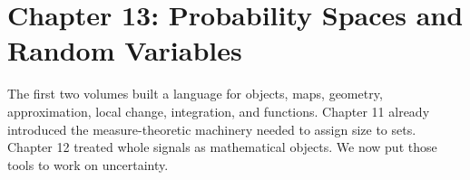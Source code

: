 \section{Chapter 13: Probability Spaces and Random Variables}
\label{ch:probability-spaces-random-variables}

The first two volumes built a language for objects, maps, geometry, approximation, local change, integration, and functions. Chapter 11 already introduced the measure-theoretic machinery needed to assign size to sets. Chapter 12 treated whole signals as mathematical objects. We now put those tools to work on uncertainty.

